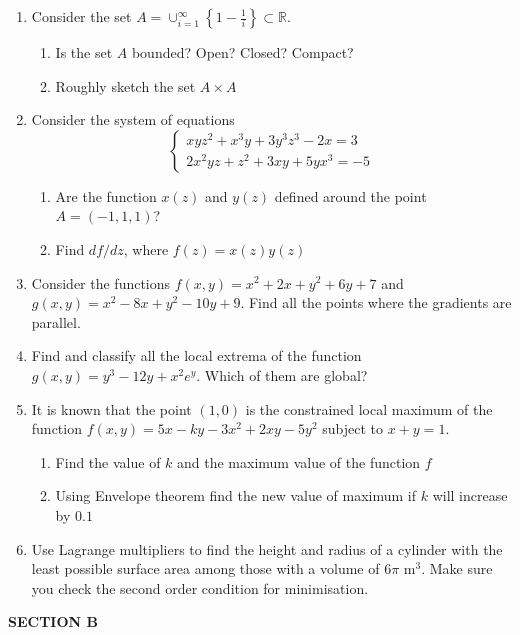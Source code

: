 \documentclass[12pt]{article} %
\theoremstyle{definition} %
\begin{document}
\begin{enumerate}
\item Consider the set $A=\cup_{i=1}^{\infty} \left\{ 1-\frac{1}{i} \right\} \subset \mathbb{R}$.
\begin{enumerate}
\item Is the set $A$ bounded? Open? Closed? Compact?
\item Roughly sketch the set $A \times A$
\end{enumerate}

\item Consider the system of equations
\[
\begin{cases}
xyz^2+x^3y+3y^3z^3-2x=3 \\
2x^2yz+z^2+3xy+5yx^3=-5
\end{cases}
\]
\begin{enumerate}
\item Are the function $x(z)$ and $y(z)$ defined around the point $A=(-1,1,1)$?
\item Find $df/dz$, where $f(z)=x(z)y(z)$
\end{enumerate}
\item Consider the functions $f(x,y)=x^2+2x+y^2+6y+7$ and $g(x,y)=x^2-8x+y^2-10y+9$. Find all the points where the gradients are parallel.
\item Find and classify all the local extrema of the function $g(x,y)=y^3 -12y+x^2e^y$. Which of them are global?
\item It is known that the point $(1,0)$ is the constrained local maximum of the function $f(x,y)=5x-ky-3x^2+2xy-5y^2$ subject to $x+y=1$.
\begin{enumerate}
\item Find the value of $k$ and the maximum value of the function $f$
\item Using Envelope theorem find the new value of maximum if $k$ will increase by $0.1$
\end{enumerate}
\item Use Lagrange multipliers to find the height and radius of a cylinder with the least possible
surface area among those with a volume of $6\pi$ m$^3$. Make sure you check the second order
condition for minimisation.
\end{enumerate}

\textbf{SECTION B}
\end{document}
